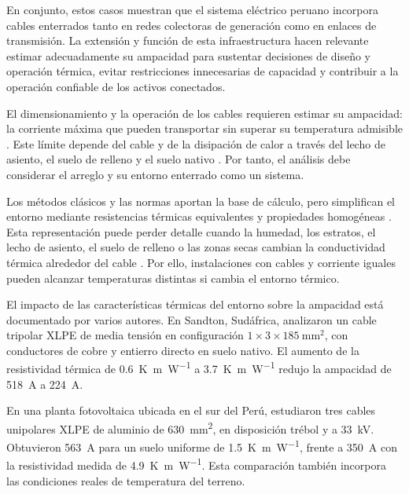 En conjunto, estos casos muestran que el sistema eléctrico peruano incorpora cables enterrados tanto en redes colectoras de generación como en enlaces de transmisión. La extensión y función de esta infraestructura hacen relevante estimar adecuadamente su ampacidad para sustentar decisiones de diseño y operación térmica, evitar restricciones innecesarias de capacidad y contribuir a la operación confiable de los activos conectados.

El dimensionamiento y la operación de los cables requieren estimar su ampacidad: la corriente máxima que pueden transportar sin superar su temperatura admisible \parencite{iec60287}. Este límite depende del cable y de la disipación de calor a través del lecho de asiento, el suelo de relleno y el suelo nativo \parencites{fariz2026}{mobius2025}. Por tanto, el análisis debe considerar el arreglo y su entorno enterrado como un sistema.

Los métodos clásicos y las normas aportan la base de cálculo, pero simplifican el entorno mediante resistencias térmicas equivalentes y propiedades homogéneas \parencites[752--760]{neher1957}{iec60287}{iec60853}. Esta representación puede perder detalle cuando la humedad, los estratos, el lecho de asiento, el suelo de relleno o las zonas secas cambian la conductividad térmica alrededor del cable \parencites[4--6]{enescu2021}[1--3]{aldulaimi2024}. Por ello, instalaciones con cables y corriente iguales pueden alcanzar temperaturas distintas si cambia el entorno térmico.

El impacto de las características térmicas del entorno sobre la ampacidad está documentado por varios autores. En Sandton, Sudáfrica, \textcite[5--6, tabs.~2--3]{khumalo2025} analizaron un cable tripolar XLPE de media tensión en configuración $1\times3\times\SI{185}{\milli\metre\squared}$, con conductores de cobre y entierro directo en suelo nativo. El aumento de la resistividad térmica de \SI{0.6}{\kelvin\metre\per\watt} a \SI{3.7}{\kelvin\metre\per\watt} redujo la ampacidad de \SI{518}{\ampere} a \SI{224}{\ampere}.

En una planta fotovoltaica ubicada en el sur del Perú, \textcite[7--8]{ariasVelasquez2023} estudiaron tres cables unipolares XLPE de aluminio de \SI{630}{\milli\metre\squared}, en disposición trébol y a \SI{33}{\kilo\volt}. Obtuvieron \SI{563}{\ampere} para un suelo uniforme de \SI{1.5}{\kelvin\metre\per\watt}, frente a \SI{350}{\ampere} con la resistividad medida de \SI{4.9}{\kelvin\metre\per\watt}. Esta comparación también incorpora las condiciones reales de temperatura del terreno.

